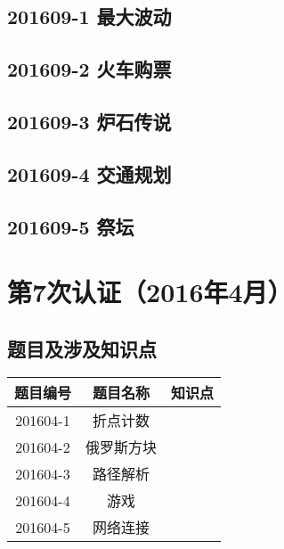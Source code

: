 \documentclass[cn,10pt,math=newtx,citestyle=gb7714-2015,bibstyle=gb7714-2015]{elegantbook}
\newif\ifonlyanalyze %
\begin{document}
\newpage
\section{201609-1 最大波动}
\ifonlyanalyze
\else
    
\fi


\newpage
\section{201609-2 火车购票}
\ifonlyanalyze
\else
    
\fi


\newpage
\section{201609-3 炉石传说}
\ifonlyanalyze
\else
    
\fi


\newpage
\section{201609-4 交通规划}
\ifonlyanalyze
\else
    
\fi


\newpage
\section{201609-5 祭坛}
\ifonlyanalyze
\else
    
\fi



\chapter{第7次认证（2016年4月）}

\section{题目及涉及知识点}

\begin{table}[htbp]
    \centering
    \begin{tabular}{ccc}
        \toprule
        题目编号 & 题目名称   & 知识点 \\
        \midrule
        201604-1 & 折点计数   &        \\
        201604-2 & 俄罗斯方块 &        \\
        201604-3 & 路径解析   &        \\
        201604-4 & 游戏       &        \\
        201604-5 & 网络连接   &        \\
        \bottomrule
    \end{tabular}
\end{table}
\end{document}
